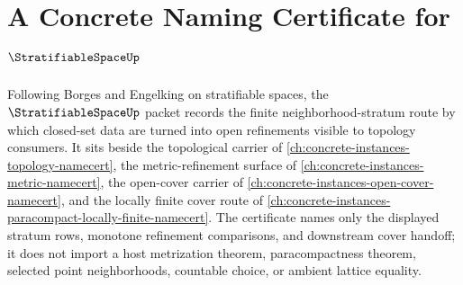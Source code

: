 \chapter{A Concrete Naming Certificate for $\StratifiableSpaceUp$}
\label{ch:concrete-instances-stratifiable-space-namecert}

Following Borges and Engelking on stratifiable spaces, the $\StratifiableSpaceUp$ packet records the finite neighborhood-stratum route by which closed-set data are turned into open refinements visible to topology consumers. It sits beside the topological carrier of \autoref{ch:concrete-instances-topology-namecert}, the metric-refinement surface of \autoref{ch:concrete-instances-metric-namecert}, the open-cover carrier of \autoref{ch:concrete-instances-open-cover-namecert}, and the locally finite cover route of \autoref{ch:concrete-instances-paracompact-locally-finite-namecert}. The certificate names only the displayed stratum rows, monotone refinement comparisons, and downstream cover handoff; it does not import a host metrization theorem, paracompactness theorem, selected point neighborhoods, countable choice, or ambient lattice equality.

